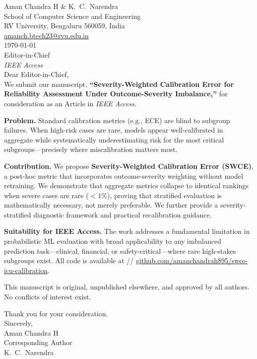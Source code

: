 \documentclass[11pt]{letter}
\begin{document}
\noindent
Aman Chandra H \& K.~C.~Narendra\\
School of Computer Science and Engineering\\
RV University, Bengaluru 560059, India\\
\href{mailto:amanch.btech23@rvu.edu.in}{amanch.btech23@rvu.edu.in}\\[1.5em]

\noindent \today\\[1.5em]

\noindent
Editor-in-Chief\\
\textit{IEEE Access}\\[1.5em]

\noindent Dear Editor-in-Chief,\\[0.8em]

We submit our manuscript, \textbf{``Severity-Weighted Calibration Error for Reliability Assessment Under Outcome-Severity Imbalance,''} for consideration as an Article in \textit{IEEE Access}.

\textbf{Problem.} Standard calibration metrics (e.g., ECE) are blind to subgroup failures. When high-risk cases are rare, models appear well-calibrated in aggregate while systematically underestimating risk for the most critical subgroups---precisely where miscalibration matters most.

\textbf{Contribution.} We propose \textbf{Severity-Weighted Calibration Error (SWCE)}, a post-hoc metric that incorporates outcome-severity weighting without model retraining. We demonstrate that aggregate metrics collapse to identical rankings when severe cases are rare ($<1\%$), proving that stratified evaluation is mathematically necessary, not merely preferable. We further provide a severity-stratified diagnostic framework and practical recalibration guidance.

\textbf{Suitability for IEEE Access.} The work addresses a fundamental limitation in probabilistic ML evaluation with broad applicability to any imbalanced prediction task---clinical, financial, or safety-critical---where rare high-stakes subgroups exist. All code is available at //
\href{https://github.com/amanchandrah895/swce-icu-calibration}{github.com/amanchandrah895/swce-icu-calibration}.

This manuscript is original, unpublished elsewhere, and approved by all authors. No conflicts of interest exist.

Thank you for your consideration.\\[1.5em]

\noindent Sincerely,\\[1em]

\noindent
Aman Chandra H\\
Corresponding Author\\[0.8em]

\noindent
K.~C.~Narendra
\end{document}
